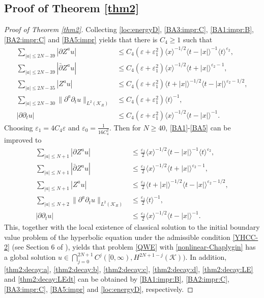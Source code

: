 \documentclass[11pt,twoside]{article}
\def\cK{\mathcal K}
\def\p{\partial}
\def\ve{\varepsilon}
\newcommand{\w}[1]{\langle {#1} \rangle}
\theoremstyle{plain}
\theoremstyle{definition}
\numberwithin{equation}{section}
\begin{document}
\subsection{Proof of Theorem \ref{thm2}}
\begin{proof}[Proof of Theorem \ref{thm2}]
Collecting \eqref{loc:energyD}, \eqref{BA3:impr:C}, \eqref{BA1:impr:B}, \eqref{BA2:impr:C} and \eqref{BA5:impr} yields that there is $C_4\ge1$ such that
\begin{align*}
\sum_{|a|\le2N-39}|\p Z^au|&\le C_4(\ve+\ve_1^2)\w{x}^{-1/2}\w{t-|x|}^{-1}\w{t}^{\ve_2},\\
\sum_{|a|\le2N-39}|\bar\p Z^au|&\le C_4(\ve+\ve_1^2)\w{x}^{-1/2}\w{t+|x|}^{\ve_2-1},\\
\sum_{|a|\le2N-35}|Z^au|&\le C_4(\ve+\ve_1^2)\w{t+|x|}^{-1/2}\w{t-|x|}^{\ve_2-1/2},\\
\sum_{|a|\le2N-30}\|\p^a\p_tu\|_{L^2(\cK_R)}&\le C_4(\ve+\ve_1^2)\w{t}^{-1},\\
|\p\p_tu|&\le C_4(\ve+\ve_1^2)\w{x}^{-1/2}\w{t-|x|}^{-1}.
\end{align*}
Choosing $\ve_1=4C_4\ve$ and $\ve_0=\frac{1}{16C_4^2}$. Then for $N\ge40$, \eqref{BA1}-\eqref{BA5} can be improved to
\begin{align*}
\sum_{|a|\le N+1}|\p Z^au|&\le\frac{\ve_1}{2}\w{x}^{-1/2}\w{t-|x|}^{-1}\w{t}^{\ve_2},\\
\sum_{|a|\le N+1}|\bar\p Z^au|&\le\frac{\ve_1}{2}\w{x}^{-1/2}\w{t+|x|}^{\ve_2-1},\\
\sum_{|a|\le N+1}|Z^au|&\le\frac{\ve_1}{2}\w{t+|x|}^{-1/2}\w{t-|x|}^{\ve_2-1/2},\\
\sum_{|a|\le N+2}\|\p^a\p_tu\|_{L^2(\cK_R)}&\le\frac{\ve_1}{2}\w{t}^{-1},\\
|\p\p_tu|&\le\frac{\ve_1}{2}\w{x}^{-1/2}\w{t-|x|}^{-1}.
\end{align*}
This, together with the local existence of classical solution to the initial boundary value problem
of the hyperbolic equation  under the admissible condition \eqref{YHCC-2} (see
Section 6 of \cite{Li-Yin18}), yields that problem \eqref{QWE} with \eqref{nonlinear-Chaplygin} has a global solution $u\in\bigcap\limits_{j=0}^{2N+1}C^{j}([0,\infty), H^{2N+1-j}(\cK))$.
In addition, \eqref{thm2:decay:a}, \eqref{thm2:decay:b}, \eqref{thm2:decay:c}, \eqref{thm2:decay:d}, \eqref{thm2:decay:LE} and \eqref{thm2:decay:LEdt} can be obtained by \eqref{BA1:impr:B}, \eqref{BA2:impr:C}, \eqref{BA3:impr:C}, \eqref{BA5:impr} and \eqref{loc:energyD}, respectively.
\end{proof}
\end{document}
